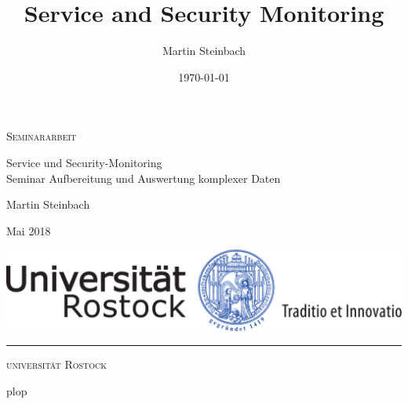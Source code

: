 \documentclass[a4paper,10pt]{scrreprt}
\title{Service and Security Monitoring}
\author{Martin Steinbach}
\date{\today}
\begin{document}

\thispagestyle{empty}

\begin{center}
  
  {\Large \textsc{Seminararbeit}
  
  \vspace{4.25cm}
  
  {\fontsize{22}{22}\selectfont Service und Security-Monitoring\\}
  \vspace{0.75cm}
  {\fontsize{22}{22}\selectfont Seminar Aufbereitung und Auswertung komplexer Daten}
}
  
  \vspace{7.25cm}
  
  {\Large Martin Steinbach
    
    \vspace{.15cm}
    
    Mai 2018}
  
  \vspace{1.5cm}
  
  
  \includegraphics[scale=0.5]{img/siegel}
  
  \vspace{0.5cm}
  
  \rule{.7\textwidth}{.40pt}
  
  \vspace{.5cm}
  
  {\large\textsc{universität Rostock}}
    
    \vspace{.15cm}
        
\end{center}

\cleardoublepage
\thispagestyle{fancy}

plop
\end{document}
